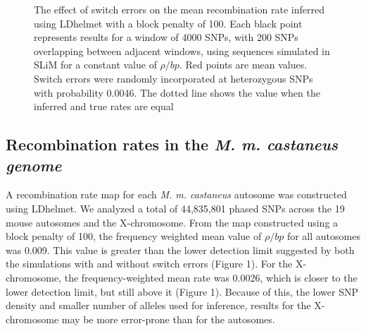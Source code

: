  
 \begin{figure}[h]
   \centering      
   \noindent{}
 \caption[The effect of switch errors on recombination rate inference]{The effect of switch errors on the mean recombination rate inferred using LDhelmet with a block penalty of 100. Each black point represents results for a window of 4000 SNPs, with 200 SNPs overlapping between adjacent windows, using sequences simulated in SLiM for a constant value of $\rho/bp$. Red points are mean values. Switch errors were randomly incorporated at heterozygous SNPs with probability 0.0046. The dotted line shows the value when the inferred and true rates are equal}
 \label{fig:1}
\end{figure}

\subsection{Recombination rates in the \emph{M. m. castaneus genome}}
 
A recombination rate map for each \emph{M. m. castaneus} autosome was constructed using LDhelmet. We analyzed a total of 44,835,801 phased SNPs across the 19 mouse autosomes and the X-chromosome. From the map constructed using a block penalty of 100, the frequency weighted mean value of $\rho/bp$ for all autosomes was 0.009. This value is greater than the lower detection limit suggested by both the simulations with and without switch errors (Figure 1). For the X-chromosome, the frequency-weighted mean rate was 0.0026, which is closer to the lower detection limit, but still above it (Figure 1). Because of this, the lower SNP density and smaller number of alleles used for inference, results for the X-chromosome may be more error-prone than for the autosomes. 

